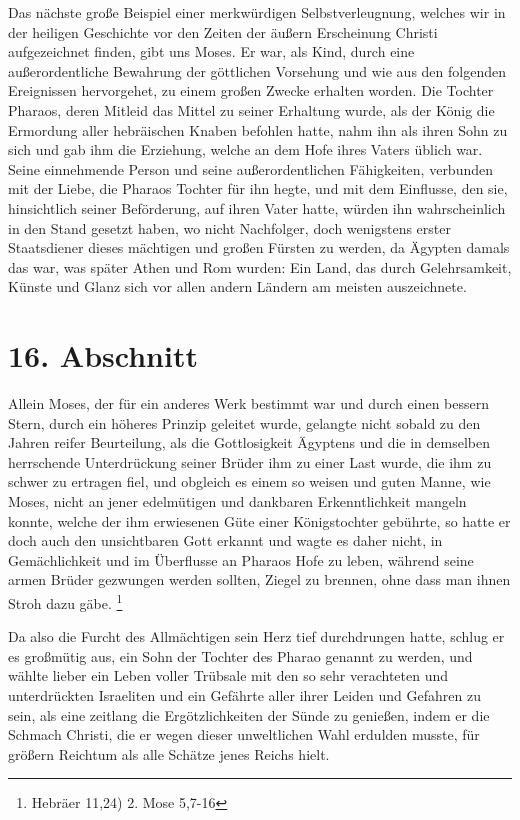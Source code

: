 Das nächste große Beispiel einer merkwürdigen
Selbstverleugnung, welches wir in
der heiligen Geschichte vor den Zeiten der äußern Erscheinung Christi
aufgezeichnet finden, gibt uns Moses. Er war, als Kind, durch eine
außerordentliche Bewahrung der göttlichen Vorsehung und wie aus den folgenden
Ereignissen hervorgehet, zu einem großen Zwecke erhalten worden. Die Tochter
Pharaos,  deren Mitleid das Mittel zu seiner Erhaltung wurde, als der König die
Ermordung aller hebräischen Knaben befohlen hatte, nahm ihn als ihren Sohn zu
sich und gab ihm die Erziehung, welche an dem Hofe ihres Vaters üblich war.
Seine einnehmende Person und seine außerordentlichen Fähigkeiten, verbunden mit
der Liebe, die Pharaos Tochter für ihn hegte, und mit dem Einflusse, den sie,
hinsichtlich seiner Beförderung, auf ihren Vater hatte, würden ihn
wahrscheinlich in den Stand gesetzt haben, wo nicht Nachfolger, doch wenigstens
erster Staatsdiener dieses mächtigen und großen Fürsten zu werden, da
Ägypten  damals das war, was später Athen
 und Rom  wurden: Ein Land, das
durch Gelehrsamkeit, Künste und Glanz sich vor allen andern Ländern am meisten
auszeichnete.

\section{16. Abschnitt} \label{kap4_ab16}

Allein Moses, der für ein anderes Werk bestimmt war und durch einen bessern
Stern, durch ein höheres Prinzip geleitet wurde, gelangte nicht sobald zu den
Jahren reifer Beurteilung, als die Gottlosigkeit Ägyptens und die in demselben
herrschende Unterdrückung seiner Brüder ihm zu einer Last wurde, die ihm zu
schwer zu ertragen fiel, und obgleich es einem so weisen und guten Manne, wie
Moses, nicht an jener edelmütigen und dankbaren Erkenntlichkeit mangeln
konnte, welche der ihm erwiesenen Güte einer Königstochter gebührte, so hatte er
doch auch den unsichtbaren Gott erkannt und wagte es daher nicht, in
Gemächlichkeit und im Überflusse an Pharaos Hofe zu leben, während seine armen
Brüder gezwungen werden sollten, Ziegel zu brennen, ohne dass man ihnen Stroh
dazu gäbe.
\footnote{Hebräer 11,24) 2. Mose 5,7-16}

\medskip

Da also die Furcht des Allmächtigen sein Herz tief durchdrungen hatte, schlug er
es großmütig aus, ein Sohn der Tochter des Pharao genannt zu werden, und wählte
lieber ein Leben voller Trübsale mit den so sehr verachteten und unterdrückten
Israeliten und ein Gefährte aller ihrer Leiden und Gefahren zu sein, als eine
zeitlang die Ergötzlichkeiten der Sünde zu genießen, indem er die Schmach
Christi, die er wegen dieser unweltlichen Wahl erdulden musste, für größern
Reichtum als alle Schätze jenes Reichs hielt.

